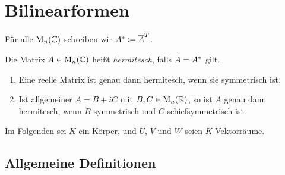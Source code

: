 \chapter{Bilinearformen}

\begin{notation}
  Für alle $\operatorname{M}_{n}(\mathbb{C})$ schreiben wir $A^* \coloneqq \overline{A}^T$.
\end{notation}

\begin{definition}
  Die Matrix $A \in \operatorname{M}_{n}(\mathbb{C})$ heißt \emph{hermitesch}, falls $A = A^*$ gilt.
\end{definition}

\begin{example}
  \leavevmode
  \begin{enumerate}
    \item
      Eine reelle Matrix ist genau dann hermitesch, wenn sie symmetrisch ist.
    \item
      Ist allgemeiner $A = B + iC$ mit $B, C \in \operatorname{M}_{n}(\mathbb{R})$, so ist $A$ genau dann hermitesch, wenn $B$ symmetrisch und $C$ schiefsymmetrisch ist.
  \end{enumerate}
\end{example}

Im Folgenden sei $K$ ein Körper, und $U$, $V$ und $W$ seien $K$-Vektorräume.





\section{Allgemeine Definitionen}

